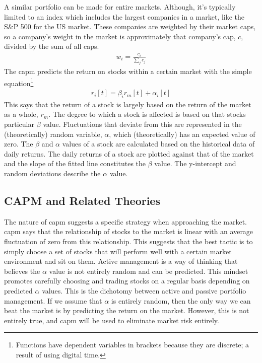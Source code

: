 A similar portfolio can be made for entire markets. Although, it's typically limited to an index which includes the largest companies in a market, like the S\&P 500 for the US market. These companies are weighted by their market caps, so a company's weight in the market is approximately that company's cap, $c$, divided by the sum of all caps.
\begin{align*}
w_i=\frac{c_i}{\sum_{j}c_j}
\end{align*}
The \ac{capm} predicts the return on stocks within a certain market with the simple equation\footnote{Functions have dependent variables in brackets because they are discrete; a result of using digital time.}
\begin{align*}
r_i[t]=\beta_i r_m[t]+\alpha_i[t]
\end{align*}
This says that the return of a stock is largely based on the return of the market as a whole, $r_m$. The degree to which a stock is affected is based on that stocks particular $\beta$ value. Fluctuations that deviate from this are represented in the (theoretically) random variable, $\alpha$, which (theoretically) has an expected value of zero. The $\beta$ and $\alpha$ values of a stock are calculated based on the historical data of daily returns. The daily returns of a stock are plotted against that of the market and the slope of the fitted line constitutes the $\beta$ value. The y-intercept and random deviations describe the $\alpha$ value.

\subsection{CAPM and Related Theories}
The nature of \ac{capm} suggests a specific strategy when approaching the market. \ac{capm} says that the relationship of stocks to the market is linear with an average fluctuation of zero from this relationship. This suggests that the best tactic is to simply choose a set of stocks that will perform well with a certain market environment and sit on them. Active management is a way of thinking that believes the $\alpha$ value is not entirely random and can be predicted. This mindset promotes carefully choosing and trading stocks on a regular basis depending on predicted $\alpha$ values. This is the dichotomy between active and passive portfolio management. If we assume that $\alpha$ is entirely random, then the only way we can beat the market is by predicting the return on the market. However, this is not entirely true, and \ac{capm} will be used to eliminate market risk entirely. \\

